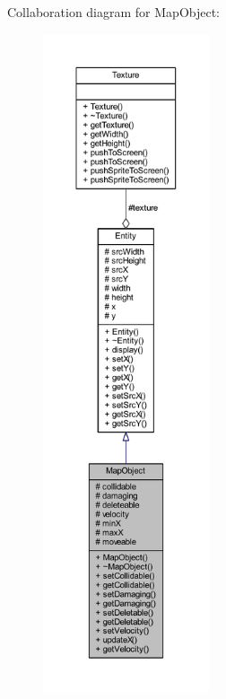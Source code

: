 Collaboration diagram for Map\+Object\+:
\nopagebreak
\begin{figure}[H]
\begin{center}
\leavevmode
\includegraphics[height=550pt]{class_map_object__coll__graph}
\end{center}
\end{figure}
